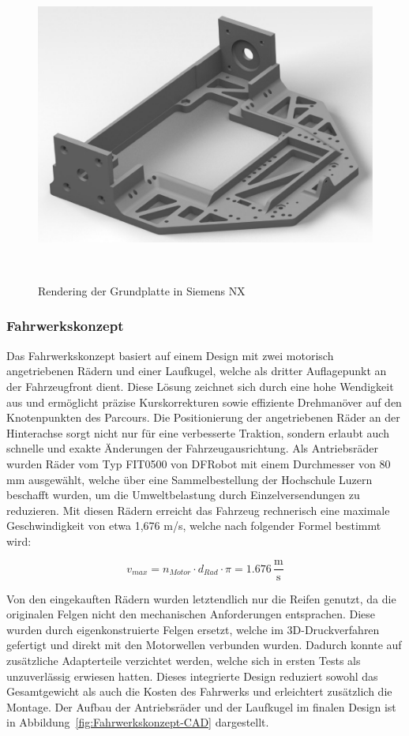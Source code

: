 \documentclass[main.tex]{subfiles} %
\begin{document}
\begin{figure}[H]
    \centering
    \includegraphics[width = 0.7\linewidth]{./fig_Mechanik/Rendering_Grundplatte.pdf}
    \caption{Rendering der Grundplatte in Siemens NX}~\label{Chassis-Grundplatte}
\end{figure}


\subsubsection*{Fahrwerkskonzept}

Das Fahrwerkskonzept basiert auf einem Design mit zwei motorisch angetriebenen Rädern 
und einer Laufkugel, welche als dritter Auflagepunkt an der Fahrzeugfront dient. 
Diese Lösung zeichnet sich durch eine hohe Wendigkeit aus und ermöglicht präzise 
Kurskorrekturen sowie effiziente Drehmanöver auf den Knotenpunkten des Parcours. 
Die Positionierung der angetriebenen Räder an der Hinterachse sorgt nicht nur für eine 
verbesserte Traktion, sondern erlaubt auch schnelle und exakte Änderungen der 
Fahrzeugausrichtung. Als Antriebsräder wurden Räder vom Typ FIT0500 von DFRobot mit 
einem Durchmesser von 80 mm ausgewählt, welche über eine Sammelbestellung der Hochschule 
Luzern beschafft wurden, um die Umweltbelastung durch Einzelversendungen zu reduzieren. 
Mit diesen Rädern erreicht das Fahrzeug rechnerisch eine maximale Geschwindigkeit von 
etwa 1,676 m/s, welche nach folgender Formel bestimmt wird:

\[ v_{max} = n_{Motor} \cdot d_{Rad} \cdot \pi = 1.676 \, \frac{\text{m}}{\text{s}} \]

Von den eingekauften Rädern wurden letztendlich nur die Reifen genutzt, da die 
originalen Felgen nicht den mechanischen Anforderungen entsprachen. Diese wurden durch 
eigenkonstruierte Felgen ersetzt, welche im 3D-Druckverfahren gefertigt und direkt mit 
den Motorwellen verbunden wurden. Dadurch konnte auf zusätzliche Adapterteile verzichtet 
werden, welche sich in ersten Tests als unzuverlässig erwiesen hatten. Dieses integrierte 
Design reduziert sowohl das Gesamtgewicht als auch die Kosten des Fahrwerks und 
erleichtert zusätzlich die Montage. Der Aufbau der Antriebsräder und der Laufkugel im 
finalen Design ist in Abbildung~\ref{fig:Fahrwerkskonzept-CAD} dargestellt.
\end{document}
